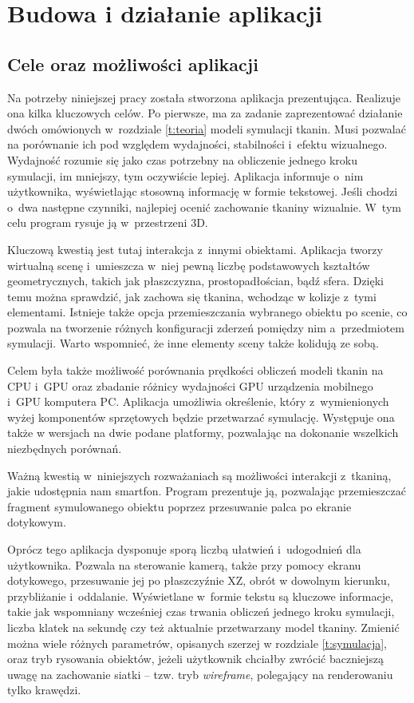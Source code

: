 \chapter{Budowa i działanie aplikacji}
\label{t:praktyka}
	
	\section{Cele oraz możliwości aplikacji}
	\label{t:praktyka:cel}
	
	
	Na potrzeby niniejszej pracy została stworzona aplikacja prezentująca. Realizuje ona kilka kluczowych celów. Po pierwsze, ma za zadanie zaprezentować działanie dwóch omówionych w~rozdziale \ref{t:teoria} modeli symulacji tkanin. Musi pozwalać na porównanie ich pod względem wydajności, stabilności i~efektu wizualnego. Wydajność rozumie się jako czas potrzebny na obliczenie jednego kroku symulacji, im mniejszy, tym oczywiście lepiej. Aplikacja informuje o~nim użytkownika, wyświetlając stosowną informację w formie tekstowej. Jeśli chodzi o~dwa następne czynniki, najlepiej ocenić zachowanie tkaniny wizualnie. W~tym celu program rysuje ją w~przestrzeni 3D. 
	
	Kluczową kwestią jest tutaj interakcja z~innymi obiektami. Aplikacja tworzy wirtualną scenę i~umieszcza w~niej pewną liczbę podstawowych kształtów geometrycznych, takich jak płaszczyzna, prostopadłościan, bądź sfera. Dzięki temu można sprawdzić, jak zachowa się tkanina, wchodząc w kolizje z~tymi elementami. Istnieje także opcja przemieszczania wybranego obiektu po scenie, co pozwala na tworzenie różnych konfiguracji zderzeń pomiędzy nim a~przedmiotem symulacji. Warto wspomnieć, że inne elementy sceny także kolidują ze sobą.
	
	Celem była także możliwość porównania prędkości obliczeń modeli tkanin na CPU i~GPU oraz zbadanie różnicy wydajności GPU urządzenia mobilnego i~GPU komputera PC. Aplikacja umożliwia określenie, który z~wymienionych wyżej komponentów sprzętowych będzie przetwarzać symulację. Występuje ona także w wersjach na dwie podane platformy, pozwalając na dokonanie wszelkich niezbędnych porównań.
	
	Ważną kwestią w~niniejszych rozważaniach są możliwości interakcji z~tkaniną, jakie udostępnia nam smartfon. Program prezentuje ją, pozwalając przemieszczać fragment symulowanego obiektu poprzez przesuwanie palca po ekranie dotykowym.
	
	Oprócz tego aplikacja dysponuje sporą liczbą ułatwień i~udogodnień dla użytkownika. Pozwala na sterowanie kamerą, także przy pomocy ekranu dotykowego, przesuwanie jej po płaszczyźnie XZ, obrót w dowolnym kierunku, przybliżanie i~oddalanie. Wyświetlane w~formie tekstu są kluczowe informacje, takie jak wspomniany wcześniej czas trwania obliczeń jednego kroku symulacji, liczba klatek na sekundę czy też aktualnie przetwarzany model tkaniny. Zmienić można wiele różnych parametrów, opisanych szerzej w rozdziale \ref{t:symulacja}, oraz tryb rysowania obiektów, jeżeli użytkownik chciałby zwrócić baczniejszą uwagę na zachowanie siatki -- tzw. tryb \emph{wireframe}, polegający na renderowaniu tylko krawędzi.
	
